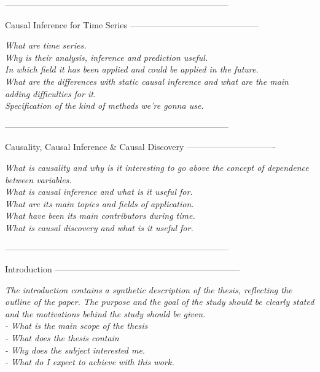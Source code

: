 ------------------------------------------------------------------------------

Causal Inference for Time Series ---------------------------------------------

\textit{
What are time series.\\ 
Why is their analysis, inference and prediction useful.\\ 
In which field it has been applied and could be applied in the future.\\ 
What are the differences with static causal inference and what are the main adding difficulties for it.\\
Specification of the kind of methods we're gonna use.\\
}

------------------------------------------------------------------------------

Causality, Causal Inference \& Causal Discovery -------------------------------

\textit{What is causality and why is it interesting to go above the concept of dependence between variables.\\
What is causal inference and what is it useful for.\\
What are its main topics and fields of application.\\
What have been its main contributors during time.\\
What is causal discovery and what is it useful for.\\
}

------------------------------------------------------------------------------

Introduction -----------------------------------------------------------------

\textit{The introduction contains a synthetic description of the thesis, reflecting the outline of the paper. The purpose and the goal of the study should be clearly stated and the motivations behind the study should be given.\\
- What is the main scope of the thesis\\
- What does the thesis contain\\
- Why does the subject interested me.\\
- What do I expect to achieve with this work.\\
}
